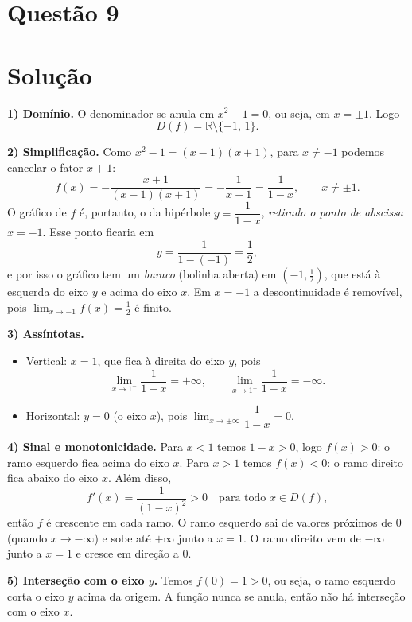 \documentclass{article}%
\begin{document}
\section*{Questão 9}

\section*{Solução}

\textbf{1) Domínio.} O denominador se anula em $x^2-1=0$, ou seja, em $x=\pm 1$. Logo
\[
D(f)=\mathbb{R}\setminus\{-1,\,1\}.
\]

\textbf{2) Simplificação.} Como $x^2-1=(x-1)(x+1)$, para $x\neq -1$ podemos cancelar o fator $x+1$:
\[
f(x)=-\frac{x+1}{(x-1)(x+1)}=-\frac{1}{x-1}=\frac{1}{1-x},\qquad x\neq \pm 1 .
\]
O gráfico de $f$ é, portanto, o da hipérbole $y=\dfrac{1}{1-x}$, \emph{retirado o ponto de abscissa} $x=-1$. Esse ponto ficaria em
\[
y=\frac{1}{1-(-1)}=\frac12 ,
\]
e por isso o gráfico tem um \emph{buraco} (bolinha aberta) em $\left(-1,\tfrac12\right)$, que está à esquerda do eixo $y$ e acima do eixo $x$. Em $x=-1$ a descontinuidade é removível, pois $\lim_{x\to -1} f(x)=\tfrac12$ é finito.

\textbf{3) Assíntotas.}
\begin{itemize}
\item Vertical: $x=1$, que fica à direita do eixo $y$, pois
\[
\lim_{x\to 1^-}\frac{1}{1-x}=+\infty,\qquad \lim_{x\to 1^+}\frac{1}{1-x}=-\infty .
\]
\item Horizontal: $y=0$ (o eixo $x$), pois $\lim_{x\to\pm\infty}\dfrac{1}{1-x}=0$.
\end{itemize}

\textbf{4) Sinal e monotonicidade.} Para $x<1$ temos $1-x>0$, logo $f(x)>0$: o ramo esquerdo fica acima do eixo $x$. Para $x>1$ temos $f(x)<0$: o ramo direito fica abaixo do eixo $x$. Além disso,
\[
f'(x)=\frac{1}{(1-x)^2}>0\quad\text{para todo } x\in D(f),
\]
então $f$ é crescente em cada ramo. O ramo esquerdo sai de valores próximos de $0$ (quando $x\to-\infty$) e sobe até $+\infty$ junto a $x=1$. O ramo direito vem de $-\infty$ junto a $x=1$ e cresce em direção a $0$.

\textbf{5) Interseção com o eixo $y$.} Temos $f(0)=1>0$, ou seja, o ramo esquerdo corta o eixo $y$ acima da origem. A função nunca se anula, então não há interseção com o eixo $x$.
\end{document}
